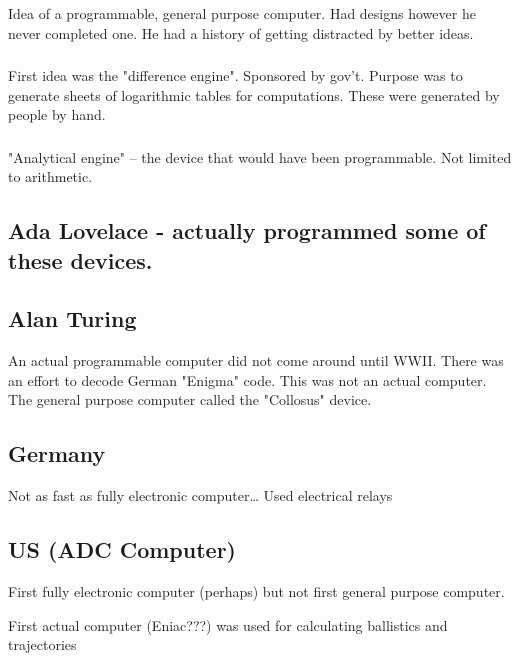 \documentclass[11pt]{article}
\begin{document}
\subsubsection{}
\label{sec-3-3-1}
Idea of a programmable, general purpose computer. Had designs
however he never completed one. He had a history of getting
distracted by better ideas.
\subsubsection{}
\label{sec-3-3-2}
First idea was the "difference engine". Sponsored by gov't. Purpose
was to generate sheets of logarithmic tables for
computations. These were generated by people by hand.
\subsubsection{}
\label{sec-3-3-3}
"Analytical engine" -- the device that would have been
programmable. Not limited to arithmetic.

\subsection{Ada Lovelace - actually programmed some of these devices.}
\label{sec-3-4}

\subsection{Alan Turing}
\label{sec-3-5}
An actual programmable computer did not come around until
WWII. There was an effort to decode German "Enigma" code. This was
not an actual computer. The general purpose computer called the
"Collosus" device.

\subsection{Germany}
\label{sec-3-6}
Not as fast as fully electronic computer\ldots{} Used electrical relays

\subsection{US (ADC Computer)}
\label{sec-3-7}
First fully electronic computer (perhaps) but not first general
purpose computer.

First actual computer (Eniac???) was used for calculating
ballistics and trajectories
\end{document}
